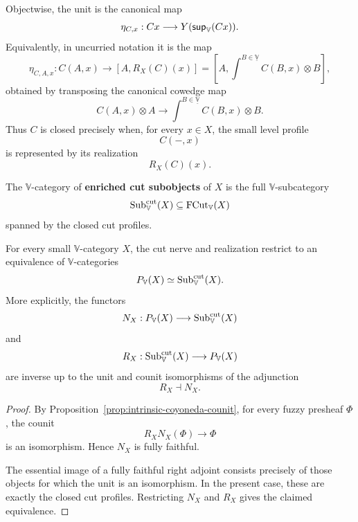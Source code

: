 Objectwise, the unit is the canonical map
\[
    \eta_{C,x}:
    Cx\longrightarrow
    Y(\mathsf{sup}_{\mathbb V}(Cx)).
\]
Equivalently, in uncurried notation it is the map
\[
    \eta_{C,A,x}:
    C(A,x)
    \longrightarrow
    [A,R_X(C)(x)]
    =
    \left[
        A,
        \int^{B\in\underline{\mathbb V}}C(B,x)\otimes B
    \right],
\]
obtained by transposing the canonical cowedge map
\[
    C(A,x)\otimes A
    \longrightarrow
    \int^{B\in\underline{\mathbb V}}C(B,x)\otimes B.
\]
Thus \(C\) is closed precisely when, for every \(x\in X\), the small level profile
\[
    C(-,x)
\]
is represented by its realization
\[
    R_X(C)(x).
\]

\begin{definition}
\label{def:enriched-cut-subobjects}
    The \(\mathbb V\)-category of \textbf{enriched cut subobjects} of \(X\) is the full \(\mathbb V\)-subcategory
    \[
        \mathrm{Sub}^{\mathrm{cut}}_{\mathbb V}(X)
        \subseteq
        \operatorname{FCut}_{\mathbb V}(X)
    \]
    spanned by the closed cut profiles.
\end{definition}

\begin{theorem}
\label{thm:cut-representation-theorem}
    For every small \(\mathbb V\)-category \(X\), the cut nerve and realization restrict to an equivalence of \(\mathbb V\)-categories
    \[
        P_{\mathbb V}(X)
        \simeq
        \mathrm{Sub}^{\mathrm{cut}}_{\mathbb V}(X).
    \]
    More explicitly, the functors
    \[
        N_X:
        P_{\mathbb V}(X)
        \longrightarrow
        \mathrm{Sub}^{\mathrm{cut}}_{\mathbb V}(X)
    \]
    and
    \[
        R_X:
        \mathrm{Sub}^{\mathrm{cut}}_{\mathbb V}(X)
        \longrightarrow
        P_{\mathbb V}(X)
    \]
    are inverse up to the unit and counit isomorphisms of the adjunction
    \[
        R_X\dashv N_X.
    \]
\end{theorem}

\begin{proof}
    By Proposition~\ref{prop:intrinsic-coyoneda-counit}, for every fuzzy presheaf \(\Phi\), the counit
    \[
        R_XN_X(\Phi)\longrightarrow \Phi
    \]
    is an isomorphism. Hence \(N_X\) is fully faithful.

    The essential image of a fully faithful right adjoint consists precisely of those objects for which the unit is an isomorphism. In the present case, these are exactly the closed cut profiles. Restricting \(N_X\) and \(R_X\) gives the claimed equivalence.
\end{proof}

